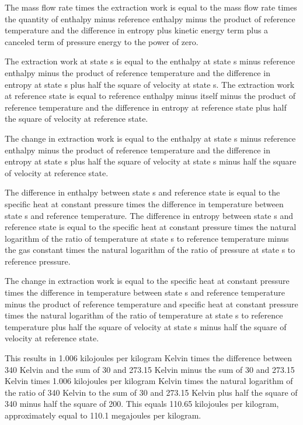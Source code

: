 The mass flow rate times the extraction work is equal to the mass flow rate times the quantity of enthalpy minus reference enthalpy minus the product of reference temperature and the difference in entropy plus kinetic energy term plus a canceled term of pressure energy to the power of zero.

The extraction work at state s is equal to the enthalpy at state s minus reference enthalpy minus the product of reference temperature and the difference in entropy at state s plus half the square of velocity at state s. The extraction work at reference state is equal to reference enthalpy minus itself minus the product of reference temperature and the difference in entropy at reference state plus half the square of velocity at reference state.

The change in extraction work is equal to the enthalpy at state s minus reference enthalpy minus the product of reference temperature and the difference in entropy at state s plus half the square of velocity at state s minus half the square of velocity at reference state.

The difference in enthalpy between state s and reference state is equal to the specific heat at constant pressure times the difference in temperature between state s and reference temperature. The difference in entropy between state s and reference state is equal to the specific heat at constant pressure times the natural logarithm of the ratio of temperature at state s to reference temperature minus the gas constant times the natural logarithm of the ratio of pressure at state s to reference pressure.

The change in extraction work is equal to the specific heat at constant pressure times the difference in temperature between state s and reference temperature minus the product of reference temperature and specific heat at constant pressure times the natural logarithm of the ratio of temperature at state s to reference temperature plus half the square of velocity at state s minus half the square of velocity at reference state.

This results in 1.006 kilojoules per kilogram Kelvin times the difference between 340 Kelvin and the sum of 30 and 273.15 Kelvin minus the sum of 30 and 273.15 Kelvin times 1.006 kilojoules per kilogram Kelvin times the natural logarithm of the ratio of 340 Kelvin to the sum of 30 and 273.15 Kelvin plus half the square of 340 minus half the square of 200. This equals 110.65 kilojoules per kilogram, approximately equal to 110.1 megajoules per kilogram.